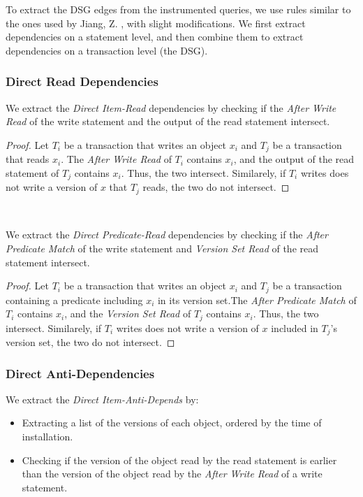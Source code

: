 To extract the DSG edges from the instrumented queries, we use rules similar to the ones used by Jiang, Z. \cite{jiang2023detecting}, with slight modifications. We first extract dependencies on a statement level, and then combine them to extract dependencies on a transaction level (the DSG).

\subsubsection{Direct Read Dependencies}

We extract the \textit{Direct Item-Read} dependencies by checking if the \textit{After Write Read} of the write statement and the output of the read statement intersect.

\begin{proof}
    Let $T_i$ be a transaction that writes an object $x_i$ and $T_j$ be a transaction that reads $x_i$. The \textit{After Write Read} of $T_i$ contains $x_i$, and the output of the read statement of $T_j$ contains $x_i$. Thus, the two intersect. Similarely, if $T_i$ writes does not write a version of $x$ that $T_j$ reads, the two do not intersect.
\end{proof}

\

We extract the \textit{Direct Predicate-Read} dependencies by checking if the \textit{After Predicate Match} of the write statement and \textit{Version Set Read} of the read statement intersect.

\begin{proof}
    Let $T_i$ be a transaction that writes an object $x_i$ and $T_j$ be a transaction containing a predicate including $x_i$ in its version set.The \textit{After Predicate Match} of $T_i$ contains $x_i$, and the \textit{Version Set Read} of $T_j$ contains $x_i$. Thus, the two intersect. Similarely, if $T_i$ writes does not write a version of $x$ included in $T_j$'s version set, the two do not intersect.
\end{proof}

\subsubsection{Direct Anti-Dependencies}

We extract the \textit{Direct Item-Anti-Depends} by:
\begin{itemize}
    \item Extracting a list of the versions of each object, ordered by the time of installation.
    \item Checking if the version of the object read by the read statement is earlier than the version of the object read by the \textit{After Write Read} of a write statement.
\end{itemize}

